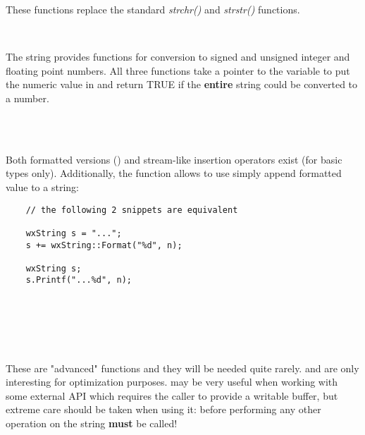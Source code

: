 These functions replace the standard {\it strchr()} and {\it strstr()} 
functions.

\\


The string provides functions for conversion to signed and unsigned integer and
floating point numbers. All three functions take a pointer to the variable to
put the numeric value in and return TRUE if the {\bf entire} string could be
converted to a number.

\\
\\


Both formatted versions () and stream-like
insertion operators exist (for basic types only). Additionally, the 
 function allows to use simply append
formatted value to a string:

\begin{verbatim}
    // the following 2 snippets are equivalent

    wxString s = "...";
    s += wxString::Format("%d", n);

    wxString s;
    s.Printf("...%d", n);
\end{verbatim}

\\
\\
\\
\\


These are "advanced" functions and they will be needed quite rarely. 
 and  are only
interesting for optimization purposes. 
 may be very useful when working with
some external API which requires the caller to provide a writable buffer, but
extreme care should be taken when using it: before performing any other
operation on the string  {\bf
must} be called!

